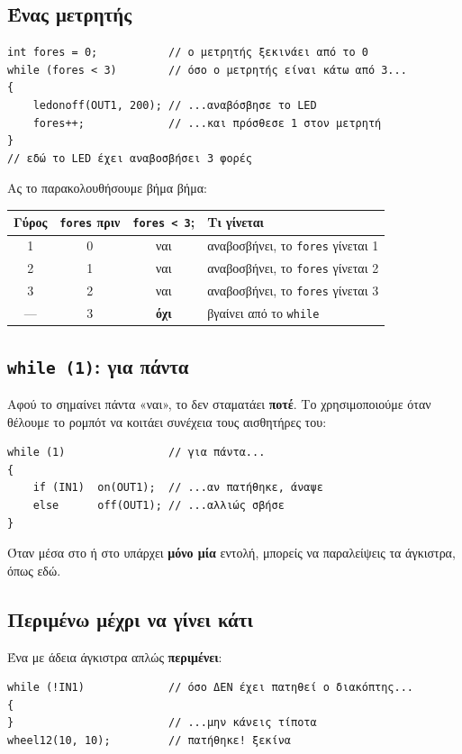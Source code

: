 \documentclass[11pt,a4paper]{article}
\newcommand{\code}[1]{\texttt{\detokenize{#1}}}
\begin{document}
\subsection*{Ένας μετρητής}
\begin{lstlisting}
int fores = 0;           // ο μετρητής ξεκινάει από το 0
while (fores < 3)        // όσο ο μετρητής είναι κάτω από 3...
{
    ledonoff(OUT1, 200); // ...αναβόσβησε το LED
    fores++;             // ...και πρόσθεσε 1 στον μετρητή
}
// εδώ το LED έχει αναβοσβήσει 3 φορές
\end{lstlisting}

Ας το παρακολουθήσουμε βήμα βήμα:
\begin{center}
\begin{tabular}{c c c l}
\toprule
\textbf{Γύρος} & \textbf{\texttt{fores} πριν} & \textbf{\texttt{fores < 3};} & \textbf{Τι γίνεται}\\
\midrule
1 & 0 & ναι & αναβοσβήνει, το \texttt{fores} γίνεται 1\\
2 & 1 & ναι & αναβοσβήνει, το \texttt{fores} γίνεται 2\\
3 & 2 & ναι & αναβοσβήνει, το \texttt{fores} γίνεται 3\\
— & 3 & \textbf{όχι} & βγαίνει από το \texttt{while}\\
\bottomrule
\end{tabular}
\end{center}

\subsection*{\texttt{while (1)}: για πάντα}
Αφού το \code{1} σημαίνει πάντα «ναι», το \code{while (1)} δεν σταματάει \textbf{ποτέ}. Το χρησιμοποιούμε όταν
θέλουμε το ρομπότ να κοιτάει συνέχεια τους αισθητήρες του:
\begin{lstlisting}
while (1)                // για πάντα...
{
    if (IN1)  on(OUT1);  // ...αν πατήθηκε, άναψε
    else      off(OUT1); // ...αλλιώς σβήσε
}
\end{lstlisting}
Όταν μέσα στο \code{if} ή στο \code{else} υπάρχει \textbf{μόνο μία} εντολή, μπορείς να παραλείψεις τα άγκιστρα,
όπως εδώ.

\subsection*{Περιμένω μέχρι να γίνει κάτι}
Ένα \code{while} με άδεια άγκιστρα απλώς \textbf{περιμένει}:
\begin{lstlisting}
while (!IN1)             // όσο ΔΕΝ έχει πατηθεί ο διακόπτης...
{
}                        // ...μην κάνεις τίποτα
wheel12(10, 10);         // πατήθηκε! ξεκίνα
\end{lstlisting}
\end{document}
